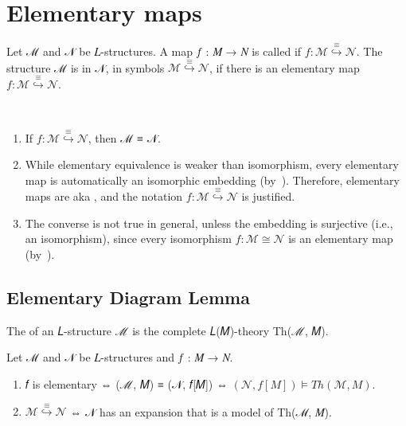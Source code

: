 \documentclass[a4paper,UKenglish,cleveref,autoref,thm-restate,12pt]{lipics-v2021-wjd}
\newcommand{\<}{\langle}
\renewcommand{\>}{\rangle}
\begin{document}
\section{Elementary maps}\label{elementary-maps}
Let ℳ and 𝒩 be 𝐿-structures. A map 𝑓 : 𝑀 → 𝑁 is called  if
\(f : ℳ \stackrel{≡}{↪} 𝒩\).
The structure ℳ is  in 𝒩, in symbols
\(ℳ \stackrel{≡}{↪} 𝒩\), if there is an elementary map \(f : ℳ \stackrel{≡}{↪} 𝒩\).\\[6pt]
\begin{remarks*}\
\begin{enumerate}
\item
  If \(f : ℳ \stackrel{≡}{↪} 𝒩\), then ℳ ≡ 𝒩.
\item
  While elementary equivalence is weaker than isomorphism, every elementary
  map is automatically an isomorphic embedding
  (by~\cite[Lemma 6.1.2(1)]{Rothmaler:2000}). Therefore, elementary maps are
  aka \defn{elementary embeddings}, and the notation
  \(f : ℳ \stackrel{≡}{↪} 𝒩\) is justified.
\item
  The converse is not true in general, unless the embedding is surjective
  (i.e., an isomorphism), since every isomorphism \(f : ℳ \cong 𝒩\) is an
  elementary map (by~\cite[Prop 6.1.3]{Rothmaler:2000}).
\end{enumerate}
\end{remarks*}

\subsection{Elementary Diagram Lemma}\label{elementary-diagram-lemma}

The  of an 𝐿-structure ℳ is the complete 𝐿(𝑀)-theory Th(ℳ, 𝑀).

\begin{lemma}
 Let ℳ and 𝒩 be 𝐿-structures and 𝑓 : 𝑀 → 𝑁.
\begin{enumerate}
\item  𝑓 is elementary ⇔ (ℳ, 𝑀) ≡ (𝒩, 𝑓[𝑀]) ⇔ \((𝒩, 𝑓[𝑀]) \models Th(ℳ, 𝑀)\).
\item \(ℳ \stackrel{≡}{↪} 𝒩\) ⇔ 𝒩 has an expansion that is a model of Th(ℳ, 𝑀).
\end{enumerate}
\end{lemma}



\end{document}
